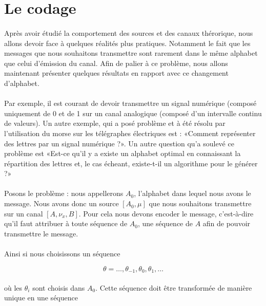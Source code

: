 
\section{Le codage}
	\paragraph{}
	Après avoir étudié la comportement des sources et des canaux thérorique, nous
	allons devoir face à quelques réalités plus pratiques. Notamment le fait
	que les messages que nous souhaitons transmettre sont rarement dans le 
	même alphabet que celui d'émission du canal. Afin de palier à ce problème,
	nous allons maintenant présenter quelques résultats en rapport avec ce 
	changement d'alphabet. 
	
	\paragraph{}
	Par exemple, il est courant de devoir transmettre un signal numérique
	(composé uniquement de 0 et de 1 sur un canal analogique (composé 
	d'un intervalle continu de valeurs).
	Un autre exemple, qui a posé problème et à été résolu par l'utilisation
	du morse sur les télégraphes électriques est : «Comment représenter des 
	lettres par un signal numérique ?». Un autre question qu'a soulevé ce problème est
	«Est-ce qu'il y a existe un alphabet optimal en connaissant la répartition
	des lettres et, le cas écheant, existe-t-il un algorithme pour le générer ?»
	
	\paragraph{}
	Posons le problème :
	nous appellerons $A_0$, l'alphabet dans lequel nous avons le message. Nous avons donc un source 
	$[A_0,\mu]$ que nous souhaitons transmettre sur un canal $[A,\nu_x,B]$. Pour cela nous devons encoder
	le message, c'est-à-dire qu'il faut attribuer à toute séquence de $A_0$, une séquence de $A$ afin de 
	pouvoir transmettre le message.

	\paragraph{}
	Ainsi si nous choisissons un séquence

	\[\theta = \dots,\theta_{-1},\theta_{0},\theta_{1},\dots\]

	\paragraph{}
	où les $\theta_i$ sont choisis dans $A_0$. Cette séquence doit être transformée de manière unique en une séquence

